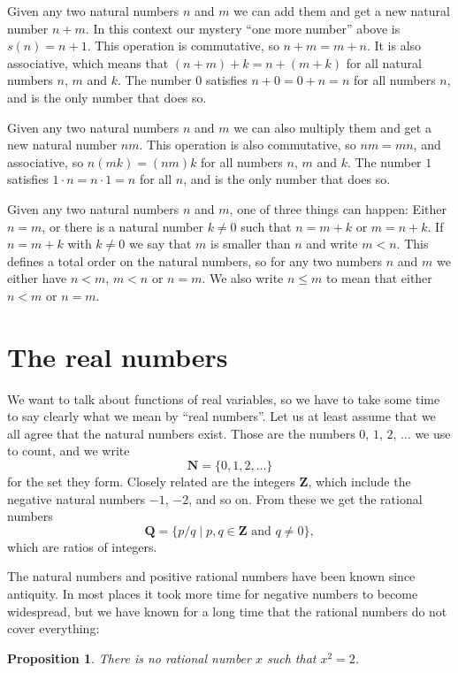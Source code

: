 \documentclass[11pt]{article}
\newtheorem{prop}[theo]{Proposition}
\theoremstyle{definition}
\def\NN{\mathbf{N}}
\def\QQ{\mathbf{Q}}
\def\ZZ{\mathbf{Z}}
\begin{document}
Given any two natural numbers $n$ and $m$ we can add them and get a new natural
number $n + m$.
In this context our mystery ``one more number'' above is $s(n) = n+1$.
This operation is commutative, so $n + m = m + n$.
It is also associative, which means that $(n + m) + k = n + (m + k)$ for all
natural numbers $n$, $m$ and $k$.
The number $0$ satisfies $n + 0 = 0 + n = n$ for all numbers $n$, and is the
only number that does so.

Given any two natural numbers $n$ and $m$ we can also multiply them and get a
new natural number $nm$.
This operation is also commutative, so $nm = mn$, and associative, so $n(mk) =
(nm)k$ for all numbers $n$, $m$ and $k$.
The number $1$ satisfies $1 \cdot n = n \cdot 1 = n$ for all $n$, and is the
only number that does so.

Given any two natural numbers $n$ and $m$, one of three things can happen:
Either $n = m$, or there is a natural number $k \not= 0$ such that $n = m + k$
or $m = n + k$.
If $n = m + k$ with $k \not= 0$ we say that $m$ is smaller than $n$ and write
$m < n$.
This defines a total order on the natural numbers, so for any two numbers $n$
and $m$ we either have $n < m$, $m < n$ or $n = m$.
We also write $n \leq m$ to mean that either $n < m$ or $n = m$.



\section{The real numbers}

We want to talk about functions of real variables, so we have to take some time
to say clearly what we mean by ``real numbers''.
Let us at least assume that we all agree that the natural numbers exist.
Those are the numbers $0$, $1$, $2$, $\ldots$ we use to count, and we write
\[
	\NN = \{0, 1, 2, \ldots \}
\]
for the set they form.
Closely related are the integers $\ZZ$, which include the negative natural
numbers $-1$, $-2$, and so on.
From these we get the rational numbers
\[
\QQ = \{ p / q \mid \text{$p, q \in \ZZ$ and $q \not= 0$} \},
\]
which are ratios of integers.

The natural numbers and positive rational numbers have been known since antiquity.
In most places it took more time for negative numbers to become
widespread, but we have known for a long time that the rational numbers do not
cover everything:

\begin{prop}
There is no rational number $x$ such that $x^2 = 2$.
\end{prop}
\end{document}
